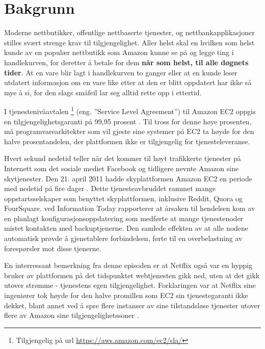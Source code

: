 \section{Bakgrunn} \label{1dot1}

Moderne nettbutikker, offentlige nettbaserte tjenester, og nettbankapplikasjoner stilles svært strenge krav til tilgjengelighet. Aller helst skal en hvilken som helst kunde av en populær nettbutikk som Amazon kunne se på og legge ting i handlekurven, for deretter å betale for dem \textbf{når som helst, til alle døgnets tider}. At en vare blir lagt i handlekurven to ganger eller at en kunde leser utdatert informasjon om en vare like etter at den er blitt oppdatert har ikke så mye å si, for den slags småfeil lar seg alltid rette opp i ettertid.

I tjenestenivåavtalen \footnote{Tilgjengelig på url \url{https://aws.amazon.com/ec2/sla/}} (eng. ''Service Level Agreement'') til Amazon EC2 oppgis en tilgjengelighetsgaranti på 99,95 prosent \citep{BCK2013}. Til tross for denne høye prosenten, må programvarearkitekter som vil gjeste sine systemer på EC2 ta høyde for den halve prosentandelen, der plattformen ikke er tilgjengelig for tjenesteleveranse.

Hvert sekund nedetid teller når det kommer til høyt trafikkerte tjenester på Internett som det sosiale mediet Facebook og tidligere nevnte Amazon sine skytjenester. Den 21. april 2011 hadde skyplattformen Amazon EC2 en periode med nedetid på fire dager \citep{BCK2013}. Dette tjenesteavbruddet rammet mange oppstartsselskaper som benyttet skyplattformen, inklusive Reddit, Quora og FourSquare. \cite{Schiller2011} ved Information Today rapporterer at årsaken til hendelsen kom av en planlagt konfigurasjonsoppdatering som medførte at mange tjenestenoder mistet kontakten med backuptjenerne. Den samlede effekten av at alle nodene automatisk prøvde å gjenetablere forbindelsen, førte til en overbelastning av forespørsler mot disse tjenerne.

En interressant bemerkning fra denne episoden er at Netflix også var en hyppig bruker av plattformen på det tidspunktet webtjenesten gikk ned, uten at det gikk utover strømme - tjenestens egen tilgjengelighet. Forklaringen var at Netflix sine ingeniører tok høyde for den halve promillen som EC2 sin tjenestegaranti ikke dekket, blant annet ved å spre flere instanser av sine tilstandsløse tjenester utover flere av Amazon sine tilgjengelighetssoner \citep{BCK2013}.

